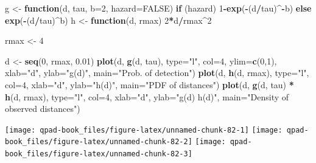 \documentclass[12pt,]{book}
\newenvironment{Shaded}{\begin{snugshade}}{\end{snugshade}}
\newcommand{\ControlFlowTok}[1]{\textcolor[rgb]{0.13,0.29,0.53}{\textbf{#1}}}
\newcommand{\DataTypeTok}[1]{\textcolor[rgb]{0.13,0.29,0.53}{#1}}
\newcommand{\DecValTok}[1]{\textcolor[rgb]{0.00,0.00,0.81}{#1}}
\newcommand{\FloatTok}[1]{\textcolor[rgb]{0.00,0.00,0.81}{#1}}
\newcommand{\KeywordTok}[1]{\textcolor[rgb]{0.13,0.29,0.53}{\textbf{#1}}}
\newcommand{\NormalTok}[1]{#1}
\newcommand{\OperatorTok}[1]{\textcolor[rgb]{0.81,0.36,0.00}{\textbf{#1}}}
\newcommand{\OtherTok}[1]{\textcolor[rgb]{0.56,0.35,0.01}{#1}}
\newcommand{\StringTok}[1]{\textcolor[rgb]{0.31,0.60,0.02}{#1}}
\begin{document}
\begin{Shaded}
\begin{Highlighting}[]
\NormalTok{g <-}\StringTok{ }\ControlFlowTok{function}\NormalTok{(d, tau, }\DataTypeTok{b=}\DecValTok{2}\NormalTok{, }\DataTypeTok{hazard=}\OtherTok{FALSE}\NormalTok{)}
  \ControlFlowTok{if}\NormalTok{ (hazard)}
    \DecValTok{1}\OperatorTok{-}\KeywordTok{exp}\NormalTok{(}\OperatorTok{-}\NormalTok{(d}\OperatorTok{/}\NormalTok{tau)}\OperatorTok{^-}\NormalTok{b) }\ControlFlowTok{else} \KeywordTok{exp}\NormalTok{(}\OperatorTok{-}\NormalTok{(d}\OperatorTok{/}\NormalTok{tau)}\OperatorTok{^}\NormalTok{b)}
\NormalTok{h <-}\StringTok{ }\ControlFlowTok{function}\NormalTok{(d, rmax)}
  \DecValTok{2}\OperatorTok{*}\NormalTok{d}\OperatorTok{/}\NormalTok{rmax}\OperatorTok{^}\DecValTok{2}
\end{Highlighting}
\end{Shaded}

\begin{Shaded}
\begin{Highlighting}[]
\NormalTok{rmax <-}\StringTok{ }\DecValTok{4}

\NormalTok{d <-}\StringTok{ }\KeywordTok{seq}\NormalTok{(}\DecValTok{0}\NormalTok{, rmax, }\FloatTok{0.01}\NormalTok{)}
\KeywordTok{plot}\NormalTok{(d, }\KeywordTok{g}\NormalTok{(d, tau), }\DataTypeTok{type=}\StringTok{"l"}\NormalTok{, }\DataTypeTok{col=}\DecValTok{4}\NormalTok{, }\DataTypeTok{ylim=}\KeywordTok{c}\NormalTok{(}\DecValTok{0}\NormalTok{,}\DecValTok{1}\NormalTok{),}
  \DataTypeTok{xlab=}\StringTok{"d"}\NormalTok{, }\DataTypeTok{ylab=}\StringTok{"g(d)"}\NormalTok{, }\DataTypeTok{main=}\StringTok{"Prob. of detection"}\NormalTok{)}
\KeywordTok{plot}\NormalTok{(d, }\KeywordTok{h}\NormalTok{(d, rmax), }\DataTypeTok{type=}\StringTok{"l"}\NormalTok{, }\DataTypeTok{col=}\DecValTok{4}\NormalTok{,}
  \DataTypeTok{xlab=}\StringTok{"d"}\NormalTok{, }\DataTypeTok{ylab=}\StringTok{"h(d)"}\NormalTok{, }\DataTypeTok{main=}\StringTok{"PDF of distances"}\NormalTok{)}
\KeywordTok{plot}\NormalTok{(d, }\KeywordTok{g}\NormalTok{(d, tau) }\OperatorTok{*}\StringTok{ }\KeywordTok{h}\NormalTok{(d, rmax), }\DataTypeTok{type=}\StringTok{"l"}\NormalTok{, }\DataTypeTok{col=}\DecValTok{4}\NormalTok{,}
  \DataTypeTok{xlab=}\StringTok{"d"}\NormalTok{, }\DataTypeTok{ylab=}\StringTok{"g(d) h(d)"}\NormalTok{, }\DataTypeTok{main=}\StringTok{"Density of observed distances"}\NormalTok{)}
\end{Highlighting}
\end{Shaded}

\texttt{[image: qpad-book\_files/figure-latex/unnamed-chunk-82-1]} \texttt{[image: qpad-book\_files/figure-latex/unnamed-chunk-82-2]} \texttt{[image: qpad-book\_files/figure-latex/unnamed-chunk-82-3]}
\end{document}
